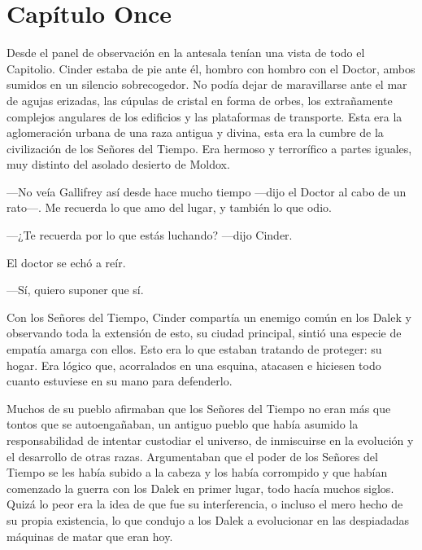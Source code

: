 \chapter*{Capítulo Once}

Desde el panel de observación en la antesala tenían una vista de todo el Capitolio. Cinder estaba de pie ante él, hombro con hombro con el Doctor, ambos sumidos en un silencio sobrecogedor. No podía dejar de maravillarse ante el mar de agujas erizadas, las cúpulas de cristal en forma de orbes, los extrañamente complejos angulares de los edificios y las plataformas de transporte. Esta era la aglomeración urbana de una raza antigua y divina, esta era la cumbre de la civilización de los Señores del Tiempo. Era hermoso y terrorífico a partes iguales, muy distinto del asolado desierto de Moldox. 



—No veía Gallifrey así desde hace mucho tiempo —dijo el Doctor al cabo de un rato—. Me recuerda lo que amo del lugar, y también lo que odio. 



—¿Te recuerda por lo que estás luchando? —dijo Cinder. 



El doctor se echó a reír. 



—Sí, quiero suponer que sí. 



Con los Señores del Tiempo, Cinder compartía un enemigo común en los Dalek y observando toda la extensión de esto, su ciudad principal, sintió una especie de empatía amarga con ellos. Esto era lo que estaban tratando de proteger: su hogar. Era lógico que, acorralados en una esquina, atacasen e hiciesen todo cuanto estuviese en su mano para defenderlo. 

Muchos de su pueblo afirmaban que los Señores del Tiempo no eran más que tontos que se autoengañaban, un antiguo pueblo que había asumido la responsabilidad de intentar custodiar el universo, de inmiscuirse en la evolución y el desarrollo de otras razas. Argumentaban que el poder de los Señores del Tiempo se les había subido a la cabeza y los había corrompido y que habían comenzado la guerra con los Dalek en primer lugar, todo hacía muchos siglos. Quizá lo peor era la idea de que fue su interferencia, o incluso el mero hecho de su propia existencia, lo que condujo a los Dalek a evolucionar en las despiadadas máquinas de matar que eran hoy. 

